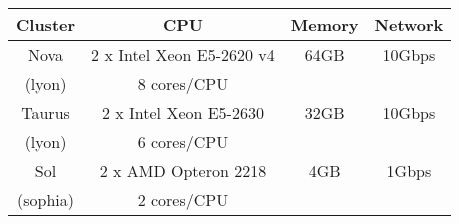 
\begin{tabular}{|c|c|c|c|}
   \hline
   Cluster & CPU & Memory & Network\\
   \hline
   Nova & 2 x Intel Xeon E5-2620 v4 & 64GB & 10Gbps\\
   (lyon) & 8 cores/CPU &  & \\
   \hline
   Taurus & 2 x Intel Xeon E5-2630 & 32GB & 10Gbps\\
   (lyon) & 6 cores/CPU & & \\
   \hline
   Sol & 2 x AMD Opteron 2218 & 4GB & 1Gbps\\
   (sophia) & 2 cores/CPU & &\\
   \hline
\end{tabular}

